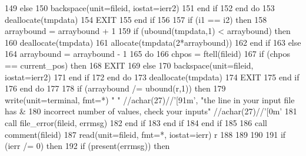 \begin{DoxyCode}
149                 \textcolor{keywordflow}{else}
150                   backspace(unit=fileid, iostat=ierr2)
151 \textcolor{keywordflow}{                end if}
152 \textcolor{keywordflow}{              end do}
153               \textcolor{keyword}{deallocate}(tmpdata)
154               \textcolor{keywordflow}{EXIT}
155 \textcolor{keywordflow}{            end if}
156             
157             \textcolor{keywordflow}{if} (i1 == i2) \textcolor{keywordflow}{then}
158               arraybound = arraybound + 1
159               \textcolor{keywordflow}{if} (ubound(tmpdata,1) < arraybound) \textcolor{keywordflow}{then}
160                 \textcolor{keyword}{deallocate}(tmpdata)
161                 \textcolor{keyword}{allocate}(tmpdata(2*arraybound))
162 \textcolor{keywordflow}{              end if}    
163             \textcolor{keywordflow}{else} 
164               arraybound = arraybound - 1
165               \textcolor{keywordflow}{do}
166                 chpos = ftell(fileid)
167                 \textcolor{keywordflow}{if} (chpos == current\_pos) \textcolor{keywordflow}{then}
168                   \textcolor{keywordflow}{EXIT}
169                 \textcolor{keywordflow}{else}
170                   backspace(unit=fileid, iostat=ierr2)
171 \textcolor{keywordflow}{                end if}
172 \textcolor{keywordflow}{              end do}
173               \textcolor{keyword}{deallocate}(tmpdata)
174               \textcolor{keywordflow}{EXIT}
175 \textcolor{keywordflow}{            end if}
176 \textcolor{keywordflow}{          end do}
177   
178           \textcolor{keywordflow}{if} (arraybound /= ubound(r,1)) \textcolor{keywordflow}{then}
179             \textcolor{keyword}{write}(unit=terminal, fmt=*) \textcolor{stringliteral}{" "} //achar(27)//\textcolor{stringliteral}{'[91m'}, \textcolor{stringliteral}{"the line in your input file has &}
180 \textcolor{stringliteral}{}\textcolor{stringliteral}{               incorrect number of values, check your inputs"} //achar(27\textcolor{comment}{)//}\textcolor{stringliteral}{'[0m'}
181             \textcolor{keyword}{call }file_error(fileid, errmsg)
182 \textcolor{keywordflow}{         end if}
183 \textcolor{keywordflow}{        end if}
184 \textcolor{keywordflow}{      end if}
185       
186       \textcolor{keyword}{call }comment(fileid)
187       \textcolor{keyword}{read}(unit=fileid, fmt=*, iostat=ierr) r
188     
189       
190       
191       \textcolor{keywordflow}{if} (ierr /= 0) \textcolor{keywordflow}{then}
192         \textcolor{keywordflow}{if} (\textcolor{keyword}{present}(errmsg)) \textcolor{keywordflow}{then}

\end{DoxyCode}
